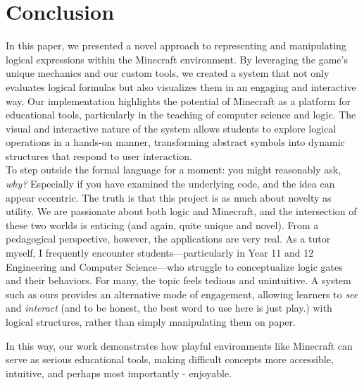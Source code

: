 \documentclass[11pt]{diazessay} %
\begin{document}
\section*{Conclusion}

In this paper, we presented a novel approach to representing and manipulating logical expressions within the Minecraft environment. By leveraging the game's unique mechanics and our custom tools, we created a system that not only evaluates logical formulas but also visualizes them in an engaging and interactive way. 
Our implementation highlights the potential of Minecraft as a platform for educational tools, particularly in the teaching of computer science and logic. The visual and interactive nature of the system allows students to explore logical operations in a hands-on manner, transforming abstract symbols into dynamic structures that respond to user interaction.\\

\medskip
To step outside the formal language for a moment: you might reasonably ask, \textit{why?} Especially if you have examined the underlying code, and the idea can appear eccentric. The truth is that this project is as much about novelty as utility. We are passionate about both logic and Minecraft, and the intersection of these two worlds is enticing (and again, quite unique and novel). 
From a pedagogical perspective, however, the applications are very real. As a tutor myself, I frequently encounter students—particularly in Year 11 and 12 Engineering and Computer Science—who struggle to conceptualize logic gates and their behaviors. For many, the topic feels tedious and unintuitive. 
A system such as ours provides an alternative mode of engagement, allowing learners to \emph{see} and \emph{interact} (and to be honest, the best word to use here is just play.) with logical structures, rather than simply manipulating them on paper.

In this way, our work demonstrates how playful environments like Minecraft can serve as serious educational tools, making difficult concepts more accessible, intuitive, and perhaps most importantly - enjoyable.
\end{document}
